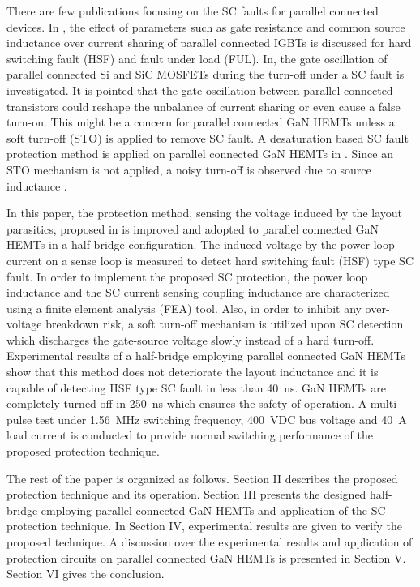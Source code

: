 \documentclass[journal]{IEEEtran}
\begin{document}
There are few publications focusing on the SC faults for parallel connected devices. In \cite{Musumeci2002}, the effect of parameters such as gate resistance and common source inductance over current sharing of parallel connected IGBTs is discussed for hard switching fault (HSF) and fault under load (FUL). In\cite{Timms2018}, the gate oscillation of parallel connected Si and SiC MOSFETs during the turn-off under a SC fault is investigated. It is pointed that the gate oscillation between parallel connected transistors could reshape the unbalance of current sharing or even cause a false turn-on. This might be a concern for parallel connected GaN HEMTs unless a soft turn-off (STO) is applied to remove SC fault. A desaturation based SC fault protection method is applied on parallel connected GaN HEMTs in \cite{Gui2018}. Since an STO mechanism is not applied, a noisy turn-off is observed due to source inductance \cite{Gui2018}.

In this paper, the protection method, sensing the voltage induced by the layout parasitics, proposed in \cite{Alemdar2019} is improved and adopted to parallel connected GaN HEMTs in a half-bridge configuration. The induced voltage by the power loop current on a sense loop is measured to detect hard switching fault (HSF) type SC fault. In order to implement the proposed SC protection, the power loop inductance and the SC current sensing coupling inductance are characterized using a finite element analysis (FEA) tool. Also, in order to inhibit any over-voltage breakdown risk, a soft turn-off mechanism is utilized upon SC detection which discharges the gate-source voltage slowly instead of a hard turn-off. Experimental results of a half-bridge employing parallel connected GaN HEMTs show that this method does not deteriorate the layout inductance and it is capable of detecting HSF type SC fault in less than 40~ns. GaN HEMTs are completely turned off in 250~ns which ensures the safety of operation. A multi-pulse test under 1.56~MHz switching frequency, 400~VDC bus voltage and 40~A load current is conducted to provide normal switching performance of the proposed protection technique.

The rest of the paper is organized as follows. Section II
describes the proposed protection technique and its operation. Section III presents the designed half-bridge employing parallel connected GaN HEMTs and application of the SC protection technique. In Section IV, experimental results are given to verify the proposed technique. A discussion over the experimental results and application of protection circuits on parallel connected GaN HEMTs is presented in Section V. Section VI gives the conclusion.
\end{document}
